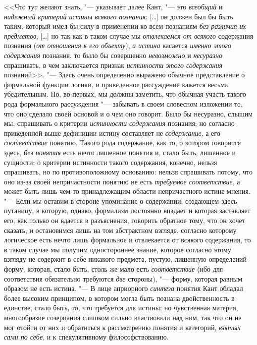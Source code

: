 {<<Что тут желают знать, "--- указывает далее Кант,
"--- это {\em всеобщий}
и {\em надежный критерий
истины всякого познания}; […] он должен был бы быть таким,
который имел бы силу в применении ко всем познаниям
{\em без различия их предметов}; […]
но так как в таком случае мы
{\em отвлекаемся от всякого}
содержания познания
({\em от отношения к его объекту}),
{\em а истина} касается
{\em именно этого содержания}
познания, то было бы совершенно
{\em невозможно} и
{\em несуразно}
спрашивать, в чем заключается признак
{\em истинности этого содержания}
познаний>>.
"--- Здесь очень определенно выражено обычное представление о
формальной функции логики, и приведенное рассуждение кажется весьма
убедительным. Но, во-первых, мы должны заметить, что обычная участь такого
рода формального рассуждения "--- забывать в своем словесном
изложении то, что оно сделало своей основой и о чем оно говорит. Было бы
несуразно, слышим мы, спрашивать о критерии
{\em истинности содержания}
познания; но согласно приведенной выше дефиниции истину
составляет не {\em содержание},
а его {\em соответствие}
понятию. Такого рода содержание, как то, о котором говорится
здесь, {\em без понятия}
есть нечто лишенное понятия и, стало быть,
лишенное и сущности; о критерии истинности такого содержания, конечно,
нельзя спрашивать, но по противоположному основанию: нельзя спрашивать
потому, что оно из-за своей непричастности понятию не есть
{\em требуемое соответствие},
а может быть лишь чем-то принадлежащим области непричастного
истине мнения. "--- Если мы оставим в стороне упоминание о
содержании, создающем здесь путаницу, в которую, однако, формализм
постоянно впадает и которая заставляет его, как только он вдается в
разъяснения, говорить обратное тому, что он хочет сказать, и остановимся
лишь на том абстрактном взгляде, согласно которому логическое есть нечто
лишь формальное и отвлекается от всякого содержания, то в таком случае мы
получим одностороннее знание, которое согласно этому взгляду не содержит в
себе никакого предмета, пустую, лишенную определений форму, которая, стало
быть, столь же мало есть
{\em соответствие} (ибо
для соответствия обязательно требуются
{\em две} стороны), "---
форму, которая равным образом не есть истина. "---
В лице априорного
{\em синтеза} понятия
Кант обладал более высоким принципом, в котором могла быть познана
двойственность в единстве, стало быть, то, что требуется для истины; но
чувственная материя, многообразие созерцания слишком сильно властвовали над
ним, так что он не мог отойти от них и обратиться к рассмотрению понятия и
категорий, {\em взятых сами по себе},
и к спекулятивному философствованию.

}
